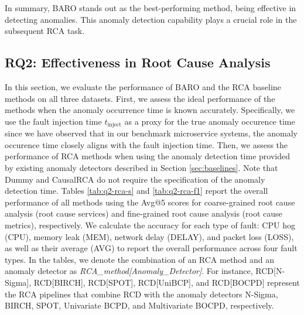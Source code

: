 In summary, BARO stands out as the best-performing method, being effective in detecting anomalies. This anomaly detection capability plays a crucial role in the subsequent RCA task. 


\subsection{RQ2: Effectiveness in Root Cause Analysis}

In this section, we evaluate the performance of BARO and the RCA baseline methods on all three datasets. First, we assess the ideal performance of the methods when the anomaly occurrence time is known accurately. Specifically, we use the fault injection time $t_{\text{inject}}$ as a proxy for the true anomaly occurence time since we have observed that in our benchmark microservice systems, the anomaly occurence time closely aligns with the fault injection time. Then, we assess the performance of RCA methods when using the anomaly detection time provided by existing anomaly detectors described in Section \ref{sec:baselines}. Note that Dummy and CausalRCA do not require the specification of the anomaly detection time. Tables \ref{tab:q2-rca-s} and \ref{tab:q2-rca-f1} report the overall performance of all methods using the Avg@5 scores for coarse-grained root cause analysis (root cause services) and fine-grained root cause analysis (root cause metrics), respectively. We calculate the accuracy for each type of fault: CPU hog (CPU), memory leak (MEM), network delay (DELAY), and packet loss (LOSS), as well as their average (AVG) to report the overall performance across four fault types. In the tables, we denote the combination of an RCA method and an anomaly detector as \textit{RCA\_method[Anomaly\_Detector]}. For instance, RCD[N-Sigma], RCD[BIRCH], RCD[SPOT], RCD[UniBCP], and RCD[BOCPD] represent the RCA pipelines that combine RCD with the anomaly detectors N-Sigma, BIRCH, SPOT, Univariate BCPD, and Multivariate BOCPD, respectively.


